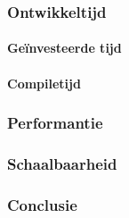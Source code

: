 \subsubsection{Ontwikkeltijd}

\paragraph{Geïnvesteerde tijd}

\paragraph{Compiletijd}

\subsubsection{Performantie}

\subsubsection{Schaalbaarheid}

\subsubsection{Conclusie}






















